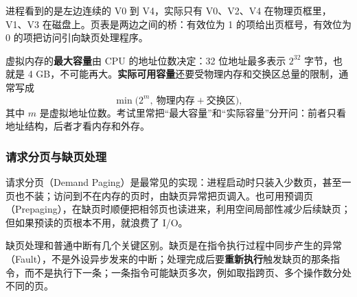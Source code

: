 进程看到的是左边连续的 V0 到 V4，实际只有 V0、V2、V4 在物理页框里，V1、V3 在磁盘上。页表是两边之间的桥：有效位为 1 的项给出页框号，有效位为 0 的项把访问引向缺页处理程序。

虚拟内存的\textbf{最大容量}由 CPU 的地址位数决定：32 位地址最多表示 $2^{32}$ 字节，也就是 4 GB，不可能再大。\textbf{实际可用容量}还要受物理内存和交换区总量的限制，通常写成
\[
\min\bigl(2^{m},\ \text{物理内存}+\text{交换区}\bigr),
\]
其中 $m$ 是虚拟地址位数。考试里常把“最大容量”和“实际容量”分开问：前者只看地址结构，后者才看内存和外存。

\subsubsection{请求分页与缺页处理}

请求分页（Demand Paging）是最常见的实现：进程启动时只装入少数页，甚至一页也不装；访问到不在内存的页时，由缺页异常把页调入。也可用预调页（Prepaging），在缺页时顺便把相邻页也读进来，利用空间局部性减少后续缺页；但如果预读的页根本不用，就浪费了 I/O。

缺页处理和普通中断有几个关键区别。缺页是在指令执行过程中同步产生的异常（Fault），不是外设异步发来的中断；处理完成后要\textbf{重新执行}触发缺页的那条指令，而不是执行下一条；一条指令可能缺页多次，例如取指跨页、多个操作数分处不同的页。

